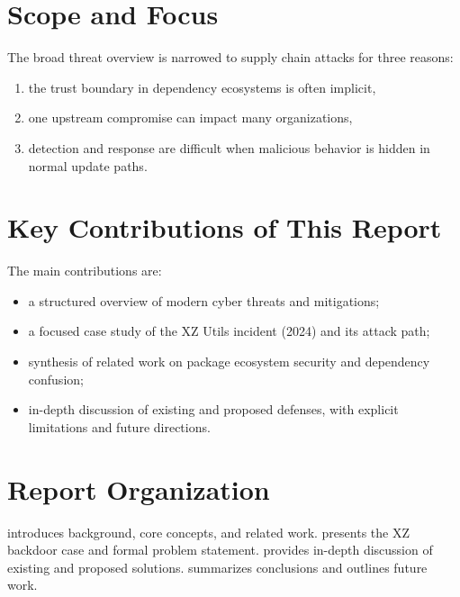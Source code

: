 \section{Scope and Focus}

The broad threat overview is narrowed to supply chain attacks for three reasons:

\begin{enumerate}[label=(\roman*)]
\item the trust boundary in dependency ecosystems is often implicit,
\item one upstream compromise can impact many organizations,
\item detection and response are difficult when malicious behavior is hidden in normal update paths.
\end{enumerate}

\section{Key Contributions of This Report}

The main contributions are:

\begin{itemize}
\item a structured overview of modern cyber threats and mitigations;
\item a focused case study of the XZ Utils incident (2024) and its attack path;
\item synthesis of related work on package ecosystem security and dependency confusion;
\item in-depth discussion of existing and proposed defenses, with explicit limitations and future directions.
\end{itemize}

\section{Report Organization}

 introduces background, core concepts, and related work.
 presents the XZ backdoor case and formal problem statement.
 provides in-depth discussion of existing and proposed solutions.
 summarizes conclusions and outlines future work.


